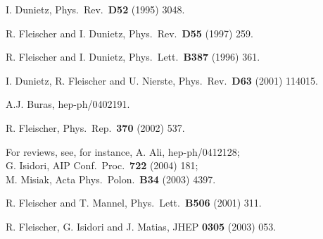 \documentclass[12pt]{article}
\begin{document}
\begin{thebibliography}{999}
I. Dunietz,
{ Phys.\ Rev.}~{\bf D52} (1995) 3048.

R. Fleischer and I. Dunietz,
{ Phys.\ Rev.}~{\bf D55} (1997) 259.

R. Fleischer and I. Dunietz,
{ Phys.\ Lett.}~{\bf B387} (1996) 361.

I. Dunietz, R. Fleischer and U. Nierste,
  { Phys.\ Rev.}~{\bf D63} (2001) 114015.

A.J. Buras,
hep-ph/0402191.


R. Fleischer,
  { Phys.\ Rep.}~{\bf 370} (2002) 537.

For reviews, see, for instance, 
A. Ali,
  hep-ph/0412128;\\
  G. Isidori,
  { AIP Conf.\ Proc.}~{\bf 722} (2004) 181;\\
  M. Misiak,
  { Acta Phys.\ Polon.}~{\bf B34} (2003) 4397.

R. Fleischer and T. Mannel,
  { Phys.\ Lett.}~{\bf B506} (2001) 311.

R. Fleischer, G. Isidori and J. Matias,
  { JHEP} {\bf 0305} (2003) 053.
  

\end{thebibliography}
\end{document}
